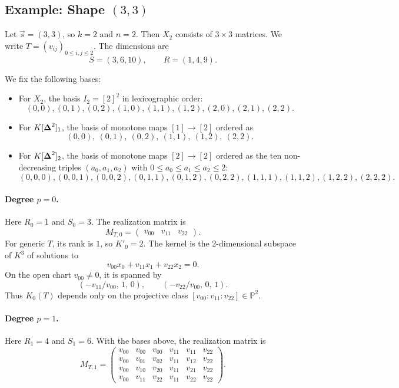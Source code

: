 \subsection{\texorpdfstring{Example: Shape $(3,3)$}{Example: Shape (3,3)}}
\label{ex:shape_33}

Let $\vec{s}=(3,3)$, so $k=2$ and $n=2$. Then $X_2$ consists of $3\times 3$
matrices. We write $T=(v_{ij})_{0\le i,j\le 2}$. The dimensions are
\[
S=(3,6,10),\qquad R=(1,4,9).
\]

We fix the following bases:
\begin{itemize}
\item For $X_2$, the basis $I_2 = [2]^2$ in lexicographic order:
\[
(0,0),(0,1),(0,2),(1,0),(1,1),(1,2),(2,0),(2,1),(2,2).
\]
\item For $K[\boldsymbol{\Delta}^2]_1$, the basis of monotone maps
      $[1]\to[2]$ ordered as
\[
(0,0),\ (0,1),\ (0,2),\ (1,1),\ (1,2),\ (2,2).
\]
\item For $K[\boldsymbol{\Delta}^2]_2$, the basis of monotone maps $[2]\to[2]$
      ordered as the ten non-decreasing triples
      $(a_0,a_1,a_2)$ with $0\le a_0\le a_1\le a_2\le 2$:
\[
(0,0,0), (0,0,1), (0,0,2), (0,1,1), (0,1,2),
(0,2,2), (1,1,1), (1,1,2), (1,2,2), (2,2,2).
\]
\end{itemize}

\paragraph{Degree $p=0$.}
Here $R_0=1$ and $S_0=3$. The realization matrix is
\[
M_{T,0} = \begin{pmatrix} v_{00} & v_{11} & v_{22} \end{pmatrix}.
\]
For generic $T$, its rank is $1$, so $K'_0 = 2$.
The kernel is the $2$-dimensional subspace of $K^3$ of solutions to
\[
v_{00}x_0 + v_{11}x_1 + v_{22}x_2 = 0.
\]
On the open chart $v_{00}\neq 0$, it is spanned by
\[
(-v_{11}/v_{00},\, 1,\,0),\qquad
(-v_{22}/v_{00},\, 0,\,1).
\]
Thus $K_0(T)$ depends only on the projective class
$[v_{00}:v_{11}:v_{22}] \in \mathbb{P}^2$.

\paragraph{Degree $p=1$.}
Here $R_1=4$ and $S_1=6$. With the bases above, the realization matrix is
\[
M_{T,1} =
\begin{pmatrix}
v_{00} & v_{00} & v_{00} & v_{11} & v_{11} & v_{22} \\
v_{00} & v_{01} & v_{02} & v_{11} & v_{12} & v_{22} \\
v_{00} & v_{10} & v_{20} & v_{11} & v_{21} & v_{22} \\
v_{00} & v_{11} & v_{22} & v_{11} & v_{22} & v_{22}
\end{pmatrix}.
\]

